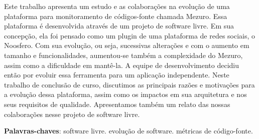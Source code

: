 \begin{resumo}

Este trabalho apresenta um estudo e as colaborações na evolução de uma plataforma para monitoramento de códigos-fonte chamada Mezuro. Essa plataforma é desenvolvida através de um projeto de software livre. Em sua concepção, ela foi pensado como um plugin de uma plataforma de redes sociais, o Noosfero.
%
Com sua evolução, ou seja, sucessivas alterações e com o aumento em tamanho e funcionalidades, aumentou-se também a complexidade do Mezuro, assim como a dificuldade em mantê-la. A equipe de desenvolvimento decidiu então por evoluir essa ferramenta para um aplicação independente.
%
Neste trabalho de conclusão de curso, discutimos as principais razões e motivações para a evolução dessa plataforma, assim como os impactos em sua arquitetura e nos seus requisitos de qualidade.
%
Apresentamos também um relato das nossas colaborações nesse projeto de software livre.
 \vspace{\onelineskip}
    
 \noindent
 \textbf{Palavras-chaves}: software livre. evolução de software. métricas de código-fonte.
\end{resumo}
